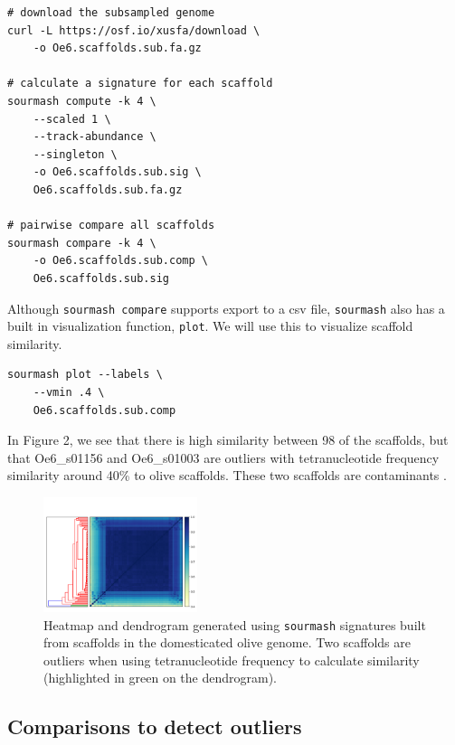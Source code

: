 \documentclass[10pt,a4paper,twocolumn]{article}
\begin{document}
\begin{lstlisting}
# download the subsampled genome
curl -L https://osf.io/xusfa/download \
    -o Oe6.scaffolds.sub.fa.gz 
    
# calculate a signature for each scaffold
sourmash compute -k 4 \ 
    --scaled 1 \ 
    --track-abundance \ 
    --singleton \ 
    -o Oe6.scaffolds.sub.sig \ 
    Oe6.scaffolds.sub.fa.gz 

# pairwise compare all scaffolds
sourmash compare -k 4 \ 
    -o Oe6.scaffolds.sub.comp \ 
    Oe6.scaffolds.sub.sig
\end{lstlisting}

Although \lstinline{sourmash compare} supports export to a csv file, \lstinline{sourmash} also has a built in visualization function, \lstinline{plot}. We will use this to visualize scaffold similarity.

\begin{lstlisting}
sourmash plot --labels \ 
    --vmin .4 \ 
    Oe6.scaffolds.sub.comp 
\end{lstlisting}

In Figure 2, we see that there is high similarity between 98 of the scaffolds, but that Oe6\_s01156 and Oe6\_s01003 are outliers with tetranucleotide frequency similarity around 40\% to olive scaffolds. These two scaffolds are contaminants \cite{Reiter2018}. 

\begin{figure}
\centering
\includegraphics[width=0.4\textwidth]{olive_genome_heatmap.pdf}
\caption{\label{fig:olive_genome_heatmap} Heatmap and dendrogram generated using \lstinline{sourmash} signatures built from scaffolds in the domesticated olive genome. Two scaffolds are outliers when using tetranucleotide frequency to calculate similarity (highlighted in green on the dendrogram).}
\end{figure}

\subsection*{Comparisons to detect outliers}
\end{document}
